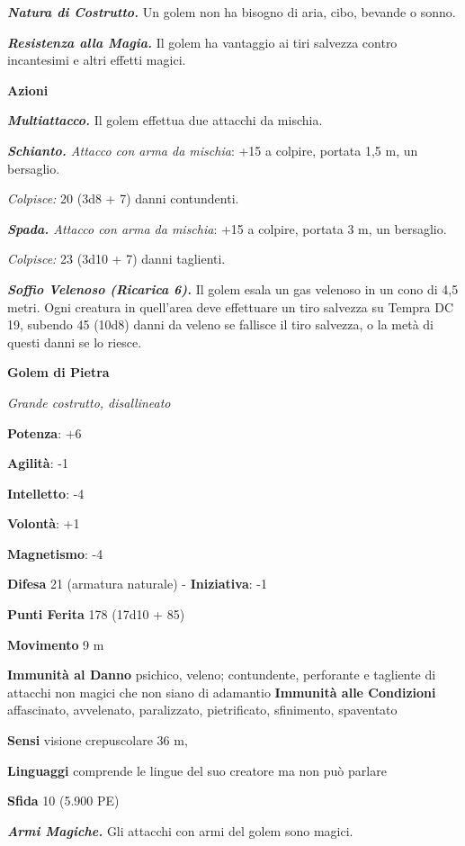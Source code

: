 \begin{multicols}{2}
\emph{\textbf{Natura di Costrutto.}} Un golem non ha bisogno di aria,
cibo, bevande o sonno.

\emph{\textbf{Resistenza alla Magia.}} Il golem ha vantaggio ai tiri
salvezza contro incantesimi e altri effetti magici.

\textbf{Azioni}

\emph{\textbf{Multiattacco.}} Il golem effettua due attacchi da mischia.

\emph{\textbf{Schianto.} Attacco con arma da mischia}: +15 a colpire,
portata 1,5 m, un bersaglio.

\emph{Colpisce:} 20 (3d8 + 7) danni contundenti.

\emph{\textbf{Spada.} Attacco con arma da mischia}: +15 a colpire,
portata 3 m, un bersaglio.

\emph{Colpisce:} 23 (3d10 + 7) danni taglienti.

\emph{\textbf{Soffio Velenoso (Ricarica 6).}} Il golem esala un gas
velenoso in un cono di 4,5 metri. Ogni creatura in quell'area deve
effettuare un tiro salvezza su Tempra DC 19, subendo 45 (10d8)
danni da veleno se fallisce il tiro salvezza, o la metà di questi danni
se lo riesce.

\textbf{Golem di Pietra}

\emph{Grande costrutto, disallineato}

\textbf{Potenza}: +6

\textbf{Agilità}: -1

\textbf{Intelletto}: -4

\textbf{Volontà}: +1

\textbf{Magnetismo}: -4

\textbf{Difesa} 21 (armatura naturale) - \textbf{Iniziativa}: -1

\textbf{Punti Ferita} 178 (17d10 + 85)

\textbf{Movimento} 9 m

\textbf{Immunità al Danno} psichico, veleno; contundente, perforante e
tagliente di attacchi non magici che non siano di adamantio
\textbf{Immunità alle Condizioni} affascinato, avvelenato, paralizzato,
pietrificato, sfinimento, spaventato

\textbf{Sensi} visione crepuscolare 36 m, 

\textbf{Linguaggi} comprende le lingue del suo creatore ma non può
parlare

\textbf{Sfida} 10 (5.900 PE)

\emph{\textbf{Armi Magiche.}} Gli attacchi con armi del golem sono
magici.


\end{multicols}
